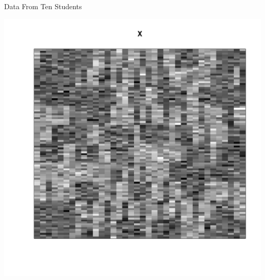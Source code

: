 \beginmyfig
  \vspace{-5mm}
  \caption{Data From Ten Students}
  \vspace{-2mm}
  \includegraphics{images/Y.pdf}
  \vspace{-15mm}
\endmyfig

